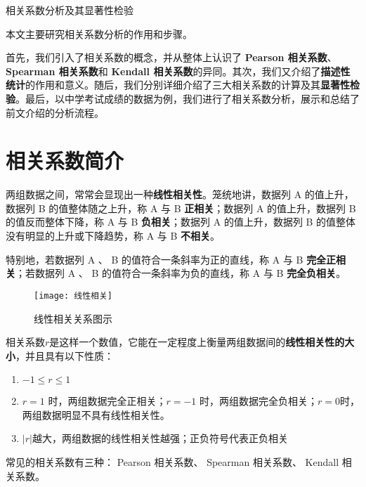 \documentclass[withoutpreface]{cumcmthesis}
\begin{document}
\begin{abstractpage}{相关系数分析及其显著性检验}

    本文主要研究相关系数分析的作用和步骤。

    首先，我们引入了相关系数的概念，并从整体上认识了\textbf{ Pearson 相关系数}、 \textbf{Spearman 相关系数}和 \textbf{Kendall 相关系数}的异同。其次，我们又介绍了\textbf{描述性统计}的作用和意义。随后，我们分别详细介绍了三大相关系数的计算及其\textbf{显著性检验}。最后，以中学考试成绩的数据为例，我们进行了相关系数分析，展示和总结了前文介绍的分析流程。

\end{abstractpage}

\tocpage

\section{相关系数简介}

两组数据之间，常常会显现出一种\textbf{线性相关性}。笼统地讲，数据列 A 的值上升，数据列 B 的值整体随之上升，称 A 与 B \textbf{正相关}；数据列 A 的值上升，数据列 B 的值反而整体下降，称 A 与 B \textbf{负相关}；数据列 A 的值上升，数据列 B 的值整体没有明显的上升或下降趋势，称 A 与 B \textbf{不相关}。

特别地，若数据列 A 、 B 的值符合一条斜率为正的直线，称 A 与 B \textbf{完全正相关}；若数据列 A 、 B 的值符合一条斜率为负的直线，称 A 与 B \textbf{完全负相关}。

\begin{figure}[H]
    \centering
    \texttt{[image: 线性相关]}
    \caption{线性相关关系图示}\label{Fig:1}
\end{figure}

相关系数$r$是这样一个数值，它能在一定程度上衡量两组数据间的\textbf{线性相关性的大小}，并且具有以下性质：

\begin{enumerate}
    \item $-1\le r \le1$
    \item $r=1$ 时，两组数据完全正相关；$r=-1$ 时，两组数据完全负相关；$r=0$时，两组数据明显不具有线性相关性。
    \item $|r|$越大，两组数据的线性相关性越强；正负符号代表正负相关
\end{enumerate}

常见的相关系数有三种： Pearson 相关系数、 Spearman 相关系数、 Kendall 相关系数。
\end{document}
